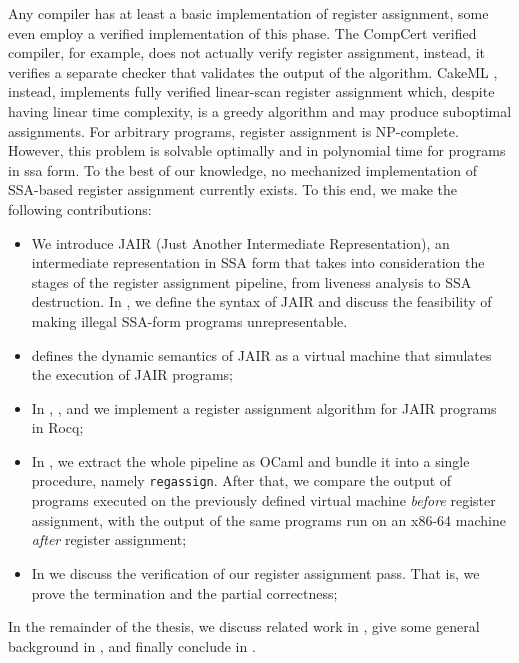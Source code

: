 Any compiler has at least a basic implementation of register assignment, some even employ a verified implementation of this phase. The CompCert \cite{Rideau-Leroy-regalloc} verified compiler, for example, does not actually verify register assignment, instead, it verifies a separate checker that validates the output of the algorithm. CakeML \cite{10.1145/2578855.2535841}, instead, implements fully verified linear-scan register assignment which, despite having linear time complexity, is a greedy algorithm and may produce suboptimal assignments.
For arbitrary programs, register assignment is NP-complete. However, this problem is solvable optimally and in polynomial time for programs in \gls{ssa} form.
To the best of our knowledge, no mechanized implementation of SSA-based register assignment currently exists. To this end, we make the following contributions:

\begin{itemize}
    \item We introduce JAIR (Just Another Intermediate Representation), an intermediate representation in SSA form that takes into consideration the stages of the register assignment pipeline, from liveness analysis to SSA destruction. In , we define the syntax of JAIR and discuss the feasibility of making illegal SSA-form programs unrepresentable.

    \item {} defines the dynamic semantics of JAIR as a virtual machine that simulates the execution of JAIR programs;

    \item In , , and  we implement a register assignment algorithm for JAIR programs in Rocq;

    \item In , we extract the whole pipeline as OCaml and bundle it into a single procedure, namely \texttt{regassign}. After that, we compare the output of programs executed on the previously defined virtual machine \textit{before} register assignment, with the output of the same programs run on an x86-64 machine \textit{after} register assignment;

    \item In  we discuss the verification of our register assignment pass. That is, we prove the termination and the partial correctness;
\end{itemize}

In the remainder of the thesis, we discuss related work in , give some general background in , and finally conclude in .

